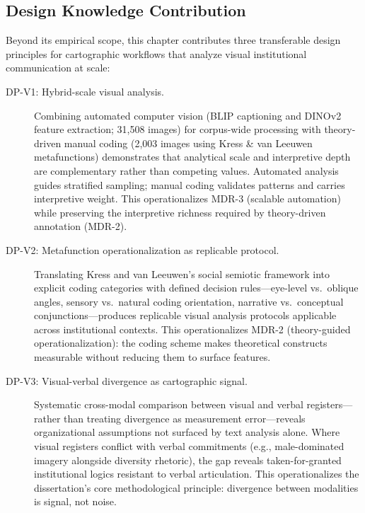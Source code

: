 \documentclass[../main.tex]{subfiles}
\begin{document}
\subsection{Design Knowledge Contribution}

Beyond its empirical scope, this chapter contributes three transferable design principles for cartographic workflows that analyze visual institutional communication at scale:

\begin{description}
    \item[DP-V1: Hybrid-scale visual analysis.] Combining automated computer vision (BLIP captioning and DINOv2 feature extraction; 31,508 images) for corpus-wide processing with theory-driven manual coding (2,003 images using Kress \& van Leeuwen metafunctions) demonstrates that analytical scale and interpretive depth are complementary rather than competing values. Automated analysis guides stratified sampling; manual coding validates patterns and carries interpretive weight. This operationalizes MDR-3 (scalable automation) while preserving the interpretive richness required by theory-driven annotation (MDR-2).

    \item[DP-V2: Metafunction operationalization as replicable protocol.] Translating Kress and van Leeuwen's social semiotic framework into explicit coding categories with defined decision rules---eye-level vs.\ oblique angles, sensory vs.\ natural coding orientation, narrative vs.\ conceptual conjunctions---produces replicable visual analysis protocols applicable across institutional contexts. This operationalizes MDR-2 (theory-guided operationalization): the coding scheme makes theoretical constructs measurable without reducing them to surface features.

    \item[DP-V3: Visual-verbal divergence as cartographic signal.] Systematic cross-modal comparison between visual and verbal registers---rather than treating divergence as measurement error---reveals organizational assumptions not surfaced by text analysis alone. Where visual registers conflict with verbal commitments (e.g., male-dominated imagery alongside diversity rhetoric), the gap reveals taken-for-granted institutional logics resistant to verbal articulation. This operationalizes the dissertation's core methodological principle: divergence between modalities is signal, not noise.
\end{description}
\end{document}
